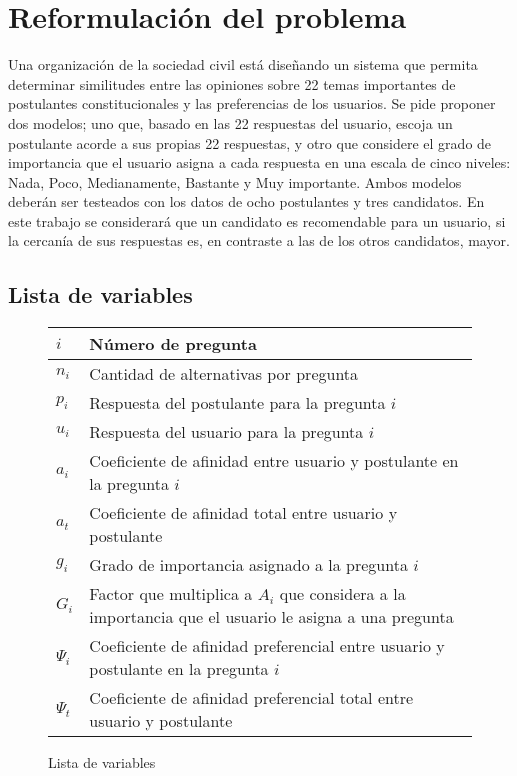 \documentclass[a4paper]{article}
\begin{document}
\section{Reformulación del problema}
Una organización de la sociedad civil está diseñando un sistema que permita determinar similitudes entre las opiniones sobre 22 temas importantes de postulantes constitucionales y las preferencias de los usuarios. Se pide proponer dos modelos; uno que, basado en las 22 respuestas del usuario, escoja un postulante acorde a sus propias 22 respuestas, y otro que considere el grado de importancia que el usuario asigna a cada respuesta en una escala de cinco niveles: Nada, Poco, Medianamente, Bastante y Muy importante. Ambos modelos deberán ser testeados con los datos de ocho postulantes y tres candidatos. En este trabajo se considerará que un candidato es recomendable para un usuario, si la cercanía de sus respuestas es, en contraste a las de los otros candidatos, mayor. 
\subsection{Lista de variables}
\begin{figure}[H]
    \begin{center}
   \begin{tabular}{|m{0.37cm}|m{8cm}|}
      \hline
     $i$& Número de pregunta\\
      \hline
     $n_{i}$& Cantidad de alternativas por pregunta\\
     \hline
     $p_{i}$& Respuesta del postulante para la pregunta $i$ \\
     \hline
     $u_{i}$& Respuesta del usuario para la pregunta $i$ \\
     \hline
     $a_{i}$& Coeficiente de afinidad entre usuario y postulante en la pregunta $i$\\
     \hline
     $a_{t}$& Coeficiente de afinidad total entre usuario y postulante\\
     \hline
     $g_{i}$& Grado de importancia asignado a la pregunta $i$\\
     \hline
     $G_{i}$& Factor que multiplica a $A_{i}$ que considera a la importancia que el usuario le asigna a una pregunta \\
     \hline
     $\Psi_{i}$& Coeficiente de afinidad preferencial entre usuario y postulante en la pregunta $i$\\
     \hline
     $\Psi_{t}$& Coeficiente de afinidad preferencial total entre usuario y postulante \\
     \hline
\end{tabular} 
\end{center}
    \caption{Lista de variables}
\end{figure} 
\end{document}
